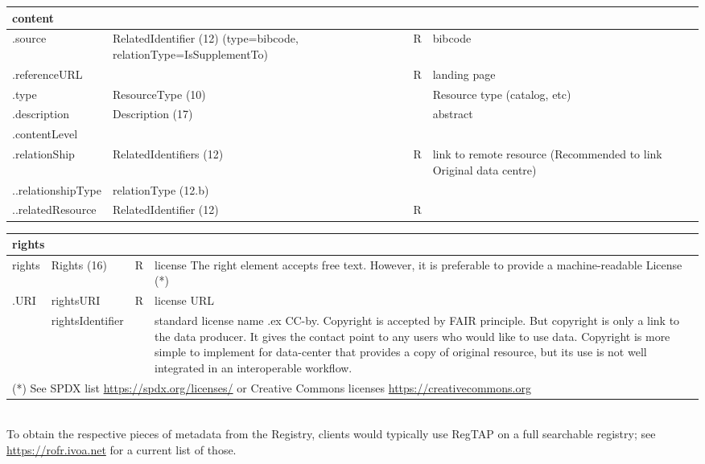 \documentclass[11pt,a4paper]{ivoa}
\begin{document}
\begin{tabular}{|p{3cm}|p{4cm}|p{1cm}|p{5cm}|} \hline
\multicolumn{4}{|l|}{\textbf{content} } \\ \hline
.source        & RelatedIdentifier (12) (type=bibcode, relationType=IsSupplementTo) & R & bibcode\\ \hline
.referenceURL  & & R & landing page\\ \hline
.type          & ResourceType (10)& & Resource type (catalog, etc)\\ \hline
.description   & Description (17)& & abstract\\ \hline
.contentLevel  & & &\\ \hline
.relationShip  & RelatedIdentifiers (12) & R &link to remote resource (Recommended to link Original data centre) \\ \hline
..relationshipType & relationType (12.b) & &\\ \hline
..relatedResource  & RelatedIdentifier (12) & R &\\ \hline
\end{tabular}

\begin{tabular}{|p{3cm}|p{4cm}|p{1cm}|p{5cm}|} \hline
\multicolumn{4}{|l|}{\textbf{rights}} \\ \hline
rights   & Rights (16)& R& license
          The right element accepts free text. However, it is preferable to provide a machine-readable License (*)
         \\ \hline
.URI     & rightsURI & R& license URL\\ \hline
         & rightsIdentifier & & standard license name .ex CC-by.
         Copyright is accepted by FAIR principle. But copyright is only a link to the data producer. It gives the contact point to any users who would like to use data. Copyright is more simple to implement for data-center that provides a copy of original resource, but its use is not well integrated in an interoperable workflow.
         \\ \hline
\multicolumn{4}{p{\textwidth}}{\footnotesize(*) See SPDX list \url{https://spdx.org/licenses/} or Creative Commons licenses \url{https://creativecommons.org}}
\end{tabular}\\

To obtain the respective pieces of metadata from the Registry, clients would typically use RegTAP \citep{2019ivoa.spec.1011D} on a full searchable registry; see \url{https://rofr.ivoa.net} for a current list of those.
\end{document}
